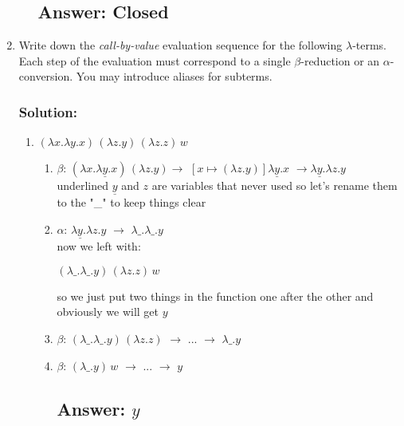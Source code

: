 \documentclass{article}
\begin{document}
\begin{enumerate}
\begin{enumerate}
        \subsection*{Answer: Closed}
    \end{enumerate}


    
    \item Write down the \emph{call-by-value} evaluation sequence for the following $\lambda$-terms. Each step of the evaluation must correspond to a single $\beta$-reduction or an $\alpha$-conversion. You may introduce aliases for subterms.
    \subsubsection*{Solution:}
    \begin{enumerate}
        \item $(\lambda x.\lambda y.x) \, (\lambda z.y) \, (\lambda z.z) \, w$
        
        \begin{enumerate}
            \item $\beta$: $(\lambda x.\lambda \underline{y}.x) \, (\lambda z.y) \rightarrow $ $[x \mapsto (\lambda z.y)]\lambda \underline{y}.x$ $\rightarrow \lambda \underline{y}.\lambda z.y$\\
            underlined $\underline{y}$ and $z$ are variables that never used so let's rename them to the "\_" to keep things clear
            \item $\alpha$: $\lambda \underline{y}.\lambda z.y$ $\rightarrow$ $\lambda \_.\lambda \_.y$\\
            now we left with:
            \begin{center}
                $(\lambda \_.\lambda \_.y) \, (\lambda z.z) \, w$
            \end{center}
            so we just put two things in the function one after the other and obviously we will get $y$

            \item $\beta$: $(\lambda \_.\lambda \_.y) \, (\lambda z.z)$ $\rightarrow$ $...$ $\rightarrow$ $\lambda \_.y$ 
            \item $\beta$: $(\lambda \_.y) \, w$ $\rightarrow$ $...$  $\rightarrow$ $y$
            \subsection*{Answer: $y$}
        \end{enumerate}


\end{enumerate}
\end{enumerate}
\end{document}
